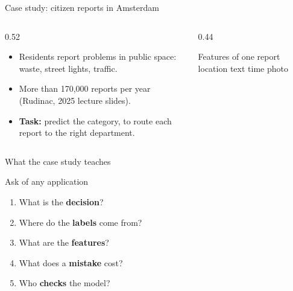 \documentclass[handout,aspectratio=169,t,9pt]{beamer}
\begin{document}
\begin{frame}{Case study: citizen reports in Amsterdam}
  \begin{columns}[T,onlytextwidth]
    \begin{column}{0.52\textwidth}
      \begin{itemize}
        \item Residents report problems in public space: waste, street
              lights, traffic.
        \item More than 170{,}000 reports per year
              (Rudinac, 2025 lecture slides).
        \item \textbf{Task:} predict the category, to route each report
              to the right department.
      \end{itemize}
    \end{column}
    \begin{column}{0.44\textwidth}
      \begin{sibbox}{Features of one report}
        location \quad text \quad time \quad photo
      \end{sibbox}
    \end{column}
  \end{columns}

  \vfill

\end{frame}

\begin{frame}{What the case study teaches}
  \vspace{0.3cm}
  \begin{keypoint}{Ask of any application}
    \begin{enumerate}
      \item What is the \textbf{decision}?
      \item Where do the \textbf{labels} come from?
      \item What are the \textbf{features}?
      \item What does a \textbf{mistake} cost?
      \item Who \textbf{checks} the model?
    \end{enumerate}
  \end{keypoint}

\end{frame}
\end{document}
